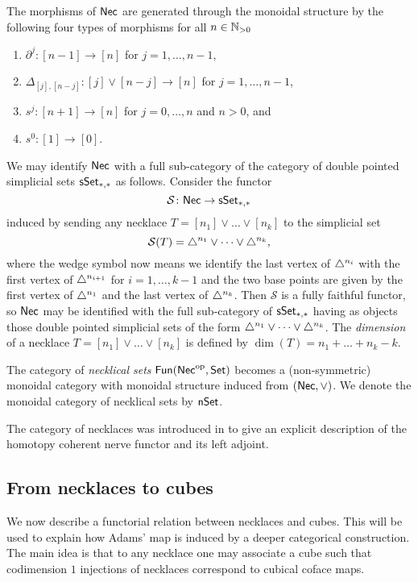 The morphisms of $\mathsf{Nec}$ are generated through the monoidal structure by the following four types of morphisms for all $n \in\mathbb{N}_{>0} $
\begin{enumerate}
	\item $\partial^j \colon [n-1] \to [n]$ for $j = 1, \dots, n-1$,
	\item $\Delta_{[j], [n-j]} \colon [j] \vee [n-j] \to [n]$ for $j = 1, \dots, n-1$,
	\item $s^j \colon [n+1] \to [n]$ for $j = 0, \dots, n$ and $n>0$, and
	\item $s^0 \colon [1] \to [0]$.
\end{enumerate}
We may identify $\mathsf{Nec}$ with a full sub-category of the category of double pointed simplicial sets $\mathsf{sSet}_{*,*}$ as follows.
Consider the functor
\[
\mathcal{S} \colon \mathsf{Nec} \to \mathsf{sSet}_{*,*}
\]
induced by sending any necklace $T = [n_1] \vee \dots \vee[n_k]$ to the simplicial set
\[
\mathcal{S}(T) = \triangle^{n_1} \vee \dots \vee \triangle^{n_k},
\]
where the wedge symbol now means we identify the last vertex of $\triangle^{n_i}$ with the first vertex of $\triangle^{n_{i+1}}$ for $i = 1, \dots, k-1$ and the two base points are given by the first vertex of $\triangle^{n_1}$ and the last vertex of $\triangle^{n_k}$.
Then $\mathcal{S}$ is a fully faithful functor, so $\mathsf{Nec}$ may be identified with the full sub-category of $\mathsf{sSet}_{*,*}$ having as objects those double pointed simplicial sets of the form $\triangle^{n_1} \vee \dots \vee \triangle^{n_k}$.
The \textit{dimension} of a necklace $T = [n_1] \vee \dots \vee[n_k]$ is defined by $\dim(T) = n_1 + \dots + n_k-k$.

The category of \textit{necklical sets} $\mathsf{Fun}(\mathsf{Nec}^{\mathrm{op}}, \mathsf{Set})$ %
becomes a (non-symmetric) monoidal category with monoidal structure induced from $(\mathsf{Nec}, \vee)$. We denote the monoidal category of necklical sets by $\mathsf{nSet}$.

\begin{remark}
	The category of necklaces was introduced in \cite{dugger2011rigidification} to give an explicit description of the homotopy coherent nerve functor and its left adjoint.
\end{remark}

\subsection{From necklaces to cubes}

We now describe a functorial relation between necklaces and cubes. This will be used to explain how Adams' map is induced by a deeper categorical construction. The main idea is that to any necklace one may associate a cube such that codimension $1$ injections of necklaces correspond to cubical coface maps.

